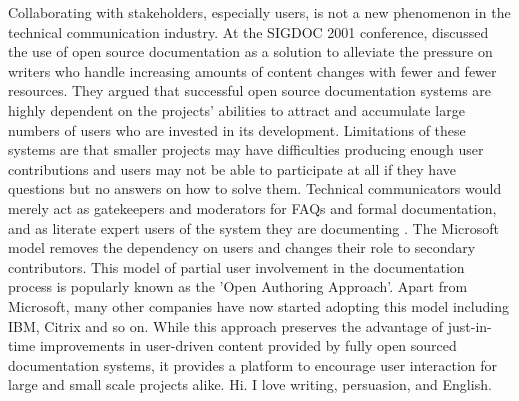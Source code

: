 Collaborating with stakeholders, especially users, is not a new phenomenon in the technical communication industry. At the SIGDOC 2001 conference, \textcite{berglund2001open} discussed the use of open source documentation as a solution to alleviate the pressure on writers who handle increasing amounts of content changes with fewer and fewer resources. They argued that successful open source documentation systems are highly dependent on the projects' abilities to attract and accumulate large numbers of users who are invested in its development. Limitations of these systems are that smaller projects may have difficulties producing enough user contributions and users may not be able to participate at all if they have questions but no answers on how to solve them. Technical communicators would merely act as gatekeepers and moderators for FAQs and formal documentation, and as literate expert users of the system they are documenting \cite{berglund2001open}. The Microsoft model removes the dependency on users and changes their role to secondary contributors. This model of partial user involvement in the documentation process is popularly known as the 'Open Authoring Approach'. Apart from Microsoft, many other companies have now started adopting this model including IBM, Citrix and so on. While this approach preserves the advantage of just-in-time improvements in user-driven content provided by fully open sourced documentation systems, it provides a platform to encourage user interaction for large and small scale projects alike. Hi. I love writing, persuasion, and English. 

